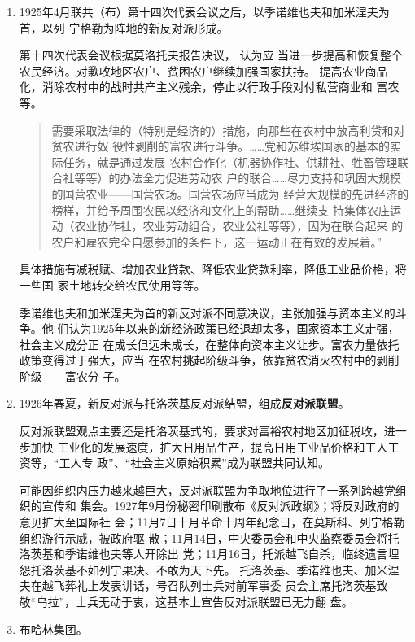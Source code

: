 \begin{enumerate}
\item 1925年4月联共（布）第十四次代表会议之后，以季诺维也夫和加米涅夫为首，以列
  宁格勒为阵地的新反对派形成。

  第十四次代表会议根据莫洛托夫报告决议， 认为应
  当进一步提高和恢复整个农民经济。对歉收地区农户、贫困农户继续加强国家扶持。
  提高农业商品化，消除农村中的战时共产主义残余，停止以行政手段对付私营商业和
  富农等。
  \begin{quotation}
    需要采取法律的（特别是经济的）措施，向那些在农村中放高利贷和对贫农进行奴
    役性剥削的富农进行斗争。……党和苏维埃国家的基本的实际任务，就是通过发展
    农村合作化（机器协作社、供耕社、牲畜管理联合社等等）的办法全力促进劳动农
    户的联合……尽力支持和巩固大规模的国营农业——国营农场。国营农场应当成为
    经营大规模的先进经济的榜样，并给予周围农民以经济和文化上的帮助……继续支
    持集体农庄运动（农业协作社，农业劳动组合，农业公社等等），因为在联合起来
    的农户和雇农完全自愿参加的条件下，这一运动正在有效的发展着。”
  \end{quotation}
  具体措施有减税赋、增加农业贷款、降低农业贷款利率，降低工业品价格，将一些国
  家土地转交给农民使用等等。

  季诺维也夫和加米涅夫为首的新反对派不同意决议，主张加强与资本主义的斗争。他
  们认为1925年以来的新经济政策已经退却太多，国家资本主义走强，社会主义成分正
  在成长但远未成长，在整体向资本主义让步。富农力量依托政策变得过于强大，应当
  在农村挑起阶级斗争，依靠贫农消灭农村中的剥削阶级——富农分
  子。

\item 1926年春夏，新反对派与托洛茨基反对派结盟，组成\textbf{反对派联盟}。

  反对派联盟观点主要还是托洛茨基式的，要求对富裕农村地区加征税收，进一步加快
  工业化的发展速度，扩大日用品生产，提高日用工业品价格和工人工资等，“工人专
  政”、“社会主义原始积累”成为联盟共同认知。

  可能因组织内压力越来越巨大，反对派联盟为争取地位进行了一系列跨越党组织的宣传和
  集会。1927年9月份秘密印刷散布《反对派政纲》；将反对政府的意见扩大至国际社
  会；11月7日十月革命十周年纪念日，在莫斯科、列宁格勒组织游行示威，被政府驱
  散；11月14日，中央委员会和中央监察委员会将托洛茨基和季诺维也夫等人开除出
  党；11月16日，托派越飞自杀，临终遗言埋怨托洛茨基不如列宁果决、不敢为天下先。
  托洛茨基、季诺维也夫、加米涅夫在越飞葬礼上发表讲话，号召队列士兵对前军事委
  员会主席托洛茨基致敬“乌拉”，士兵无动于衷，这基本上宣告反对派联盟已无力翻
  盘。

\item 布哈林集团。


\end{enumerate}
